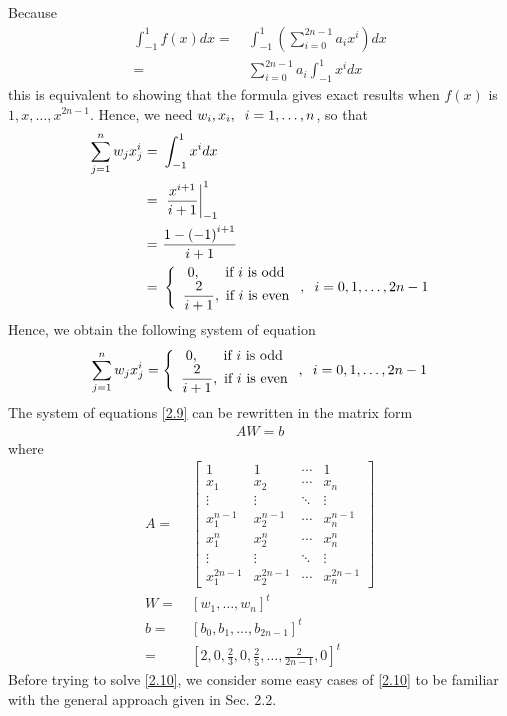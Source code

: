 \documentclass[a4paper]{article}
\numberwithin{equation}{section}
\begin{document}
Because
\begin{align}
\int_{ - 1}^1 {f\left( x \right)dx}  =&\ \int_{ - 1}^1 {\left( {\sum\limits_{i = 0}^{2n-1} {{a_i}{x^i}} } \right)dx} \\
 =&\ \sum\limits_{i = 0}^{2n-1} {{a_i}\int_{ - 1}^1 {{x^i}dx} } 
\end{align}
this is equivalent to showing that the formula gives exact results when $f\left(x\right)$ is $1,x,\ldots,x^{2n-1}$. Hence, we need $w_i,x_i,\hspace{0.2cm}i=1,\ldots,n$, so that
\begin{align}
\sum\limits_{j = 1}^n {{w_j}x_j^i}  =&\ \int_{ - 1}^1 {{x^i}dx} \\
 =&\ \left. {\frac{{{x^{i + 1}}}}{{i + 1}}} \right|_{ - 1}^1\\
 =&\ \frac{{1 - {{\left( { - 1} \right)}^{i + 1}}}}{{i + 1}}\\
 =&\ \left\{ {\begin{array}{*{20}{c}}
{0,\hspace{0.5cm}\mbox{ if }i\mbox{ is odd}}\\
{\dfrac{2}{{i + 1}},\mbox{ if } i\mbox{ is even}}
\end{array}} \right.,\hspace{0.2cm} i = 0,1, \ldots ,2n - 1
\end{align}
Hence, we obtain the following system of equation
\begin{align}
\label{2.9}
\sum\limits_{j = 1}^n {{w_j}x_j^i}  = \left\{ {\begin{array}{*{20}{c}}
{0,\hspace{0.5cm}\mbox{ if }i\mbox{ is odd}}\\
{\dfrac{2}{{i + 1}},\mbox{ if } i\mbox{ is even}}
\end{array}} \right.,\hspace{0.2cm} i = 0,1, \ldots ,2n - 1
\end{align}
The system of equations \eqref{2.9} can be rewritten in the matrix form
\begin{align}
\label{2.10}
AW=b
\end{align}
where
\begin{align}
A =&\ \left[ {\begin{array}{*{20}{c}}
1&1& \cdots &1\\
{{x_1}}&{{x_2}}& \cdots &{{x_n}}\\
 \vdots & \vdots & \ddots & \vdots \\
{x_1^{n - 1}}&{x_2^{n - 1}}& \cdots &{x_n^{n - 1}}\\
{x_1^n}&{x_2^n}& \cdots &{x_n^n}\\
 \vdots & \vdots & \ddots & \vdots \\
{x_1^{2n - 1}}&{x_2^{2n - 1}}& \cdots &{x_n^{2n - 1}}
\end{array}} \right]\\
W =&\ {\left[ {{w_1}, \ldots ,{w_n}} \right]^t}\\
b =&\ {\left[ {{b_0},{b_1}, \ldots ,{b_{2n - 1}}} \right]^t}\\
 =&\ {\left[ {2,0,\frac{2}{3},0,\frac{2}{5}, \ldots ,\frac{2}{{2n - 1}},0} \right]^t}
\end{align}
Before trying to solve \eqref{2.10}, we consider some easy cases of \eqref{2.10} to be familiar with the general approach given in Sec. 2.2.
\end{document}
